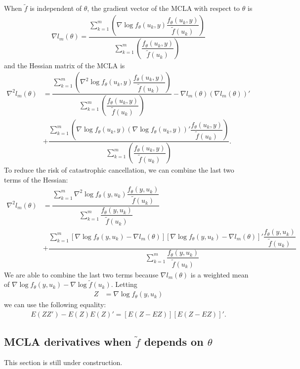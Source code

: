 \documentclass{article}
\begin{document}
When $\tilde{f}$ is independent of $\theta$, the gradient vector of the MCLA with respect to $\theta$ is
\begin{align}
\nabla l_m(\theta)= \dfrac{\sum_{k=1}^m    \left( \nabla \log f_\theta(u_k,y)  \dfrac{f_\theta(u_k,y)   }{\tilde{f}(u_k)}\right) }{\sum_{k=1}^m \left( \dfrac{f_\theta(u_k,y)}{\tilde{f}(u_k)} \right) } 
\end{align}
and the Hessian matrix of the MCLA is
\begin{align}
\nabla^2 l_m(\theta)&= \dfrac{\sum_{k=1}^m    \left( \nabla^2 \log f_\theta(u_k,y)   \dfrac{f_\theta(u_k,y)}{\tilde{f}(u_k)} \right)}{\sum_{k=1}^m \left( \dfrac{f_\theta(u_k,y)}{\tilde{f}(u_k)} \right) }- \nabla l_m(\theta) (\nabla l_m(\theta) )'  \\
&+\dfrac{\sum_{k=1}^m    \left( \nabla \log f_\theta(u_k,y) (\nabla \log f_\theta(u_k,y))'   \dfrac{f_\theta(u_k,y)}{\tilde{f}(u_k)} \right)}{\sum_{k=1}^m \left( \dfrac{f_\theta(u_k,y)}{\tilde{f}(u_k)} \right) }.
\end{align}
To reduce the risk of catastrophic cancellation, we can combine the last two terms of the Hessian:
\begin{align}
\nabla^2 l_m(\theta)&= \dfrac{   \sum_{k=1}^m  \nabla^2 \log f_\theta(y,u_k)       \dfrac{ f_\theta(y,u_k)}{\tilde{f}(u_k)}  }{\sum_{k=1}^m  \dfrac{ f_\theta(y,u_k)   }{\tilde{f}(u_k)}}\\
&+ \dfrac{   \sum_{k=1}^m \left[ \nabla \log f_\theta(y,u_k)   - \nabla l_m(\theta)   \right] \left[ \nabla \log f_\theta(y,u_k)  - \nabla l_m(\theta)  \right]'  \dfrac{ f_\theta(y,u_k)   }{\tilde{f}(u_k)}   }{\sum_{k=1}^m  \dfrac{ f_\theta(y,u_k)   }{\tilde{f}(u_k)}}
\end{align}
We are able to combine the last two terms because $\nabla l_m(\theta)$ is a weighted mean of $\nabla \log f_\theta (y,u_k)- \nabla \log \tilde{f}(u_k)$. Letting
\begin{align}
Z&=\nabla \log f_\theta (y,u_k)
\end{align}
 we can use the following equality:
\begin{align}
E(ZZ')-E(Z)E(Z)' = \left[ E(Z-EZ)  \right]\left[ E(Z-EZ)  \right]'.
\end{align}




\subsection{MCLA derivatives when $\tilde{f}$ depends on $\theta$} \label{sec:calcs}
This section is still under construction.
\end{document}
